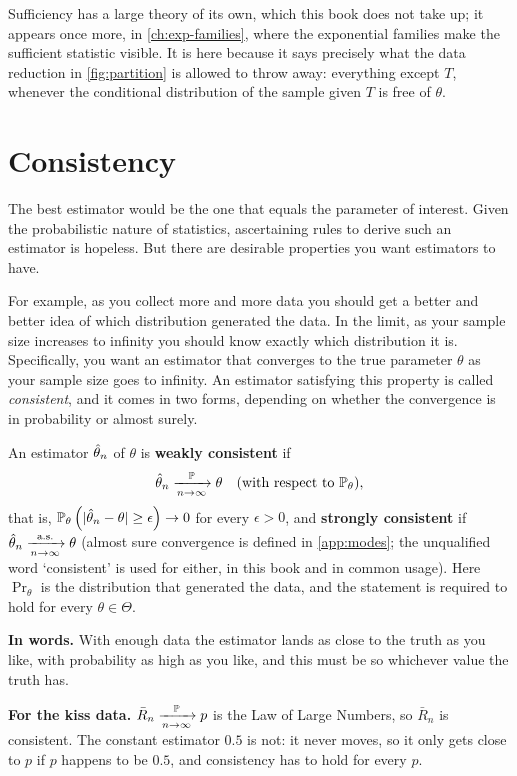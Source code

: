 Sufficiency has a large theory of its own, which this book does not take up; it appears once more, in \cref{ch:exp-families}, where the exponential families make the sufficient statistic visible.
It is here because it says precisely what the data reduction in \cref{fig:partition} is allowed to throw away: everything except $T$, whenever the conditional distribution of the sample given $T$ is free of $\theta$.

\section{Consistency}
\label{sec:est-consistency}

The best estimator would be the one that equals the parameter of interest.
Given the probabilistic nature of statistics, ascertaining rules to derive such an estimator is hopeless.
But there are desirable properties you want estimators to have.

For example, as you collect more and more data you should get a better and better idea of which distribution generated the data.
In the limit, as your sample size increases to infinity you should know exactly which distribution it is.
Specifically, you want an estimator that converges to the true parameter $\theta$ as your sample size goes to infinity.
An estimator satisfying this property is called \textit{consistent}, and it comes in two forms, depending on whether the convergence is in probability or almost surely.

\begin{definition}[Consistency]
\label{def:consistent}
An estimator $\hat{\theta}_n$ of $\theta$ is \textbf{weakly consistent} if
\[
\hat{\theta}_n \xrightarrow [n \to \infty ]{\mathbb{P}} \theta \quad (\text{with respect to } \mathbb{P}_\theta),
\]
that is, $\mathbb{P}_\theta \left( \lvert\hat{\theta}_n - \theta\rvert \geq \epsilon \right) \to 0$ for every $\epsilon > 0$, and \textbf{strongly consistent} if $\hat{\theta}_n \xrightarrow [n \to \infty ]{\text{a.s.}} \theta$ (almost sure convergence is defined in \cref{app:modes}; the unqualified word `consistent' is used for either, in this book and in common usage).
Here $\Pr_\theta$ is the distribution that generated the data, and the statement is required to hold for every $\theta \in \Theta$.
\end{definition}

\begin{inwords}
\textbf{In words.} With enough data the estimator lands as close to the truth as you like, with probability as high as you like, and this must be so whichever value the truth has.
\par\smallskip
\textbf{For the kiss data.} $\bar{R}_n \xrightarrow [n \to \infty ]{\mathbb{P}} p$ is the Law of Large Numbers, so $\bar{R}_n$ is consistent. The constant estimator $0.5$ is not: it never moves, so it only gets close to $p$ if $p$ happens to be $0.5$, and consistency has to hold for every $p$.
\end{inwords}

